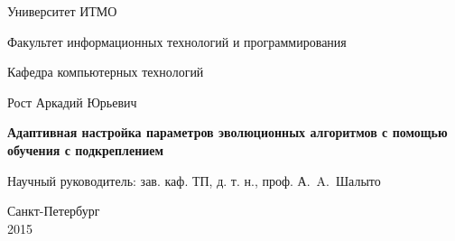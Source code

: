 \documentclass[a4paper]{report}
\theoremstyle{plain}
\theoremstyle{definition}
\numberwithin{theorem}{chapter}        %
\begin{document}
\initializefrontsections

\pagestyle{title}

\begin{center}
Университет ИТМО

\vspace{2cm}

Факультет информационных технологий и программирования

Кафедра компьютерных технологий

\vspace{3cm}

{\Large Рост Аркадий Юрьевич}

\vspace{2cm}

\vbox{\LARGE\bfseries
Адаптивная настройка параметров эволюционных алгоритмов с помощью обучения с подкреплением
}

\vspace{4cm}

{\Large Научный руководитель: зав. каф. ТП, д. т. н., проф. А.~A.~Шалыто}

\vspace{6cm}

Санкт-Петербург\\ 2015
\end{center}

\newpage

\setcounter{page}{3}
\pagestyle{plain}

\tableofcontents

\startthechapters





\printbibliography
\end{document}

